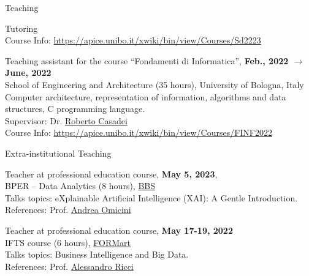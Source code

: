 \documentclass{resume} %
\begin{document}
\begin{rSection}{Teaching}
\begin{rSubsection}{Tutoring}{}{}{}
            \\Course Info: \url{https://apice.unibo.it/xwiki/bin/view/Courses/Sd2223}
            \item Teaching assistant for the course ``Fondamenti di Informatica'', \textbf{Feb., 2022 $\rightarrow$ June, 2022}
            \\School of Engineering and Architecture (35 hours), University of Bologna, Italy
            \\Computer architecture, representation of information, algorithms and data structures, C programming language.
            \\Supervisor: Dr. \href{mailto:roberto.casadei@unibo.it}{Roberto Casadei}
            \\Course Info: \url{https://apice.unibo.it/xwiki/bin/view/Courses/FINF2022}
        \end{rSubsection}


        \begin{rSubsection}{Extra-institutional Teaching}{}{}{}
            \item Teacher at professional education course, \textbf{May 5, 2023},
            \\BPER -- Data Analytics (8 hours), \href{https://www.bbs.unibo.eu/}{BBS}
            \\Talks topics: eXplainable Artificial Intelligence (XAI): A Gentle Introduction.
            \\References:  Prof. \href{mailto:andrea.omicini@unibo.it}{Andrea Omicini}
            \item Teacher at professional education course, \textbf{May 17-19, 2022}
            \\IFTS course (6 hours), \href{http://www.formart.it/home}{FORMart}
            \\Talks topics: Business Intelligence and Big Data.
            \\References:  Prof. \href{mailto:a.ricci@unibo.it}{Alessandro Ricci}
        \end{rSubsection}



\end{rSection}
\end{document}

